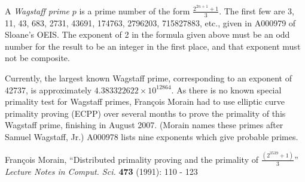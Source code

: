 \documentclass[12pt]{article}
\begin{document}
A {\em Wagstaff prime} $p$ is a prime number of the form $\displaystyle \frac{2^{2n + 1} + 1}{3}$. The first few are 3, 11, 43, 683, 2731, 43691, 174763, 2796203, 715827883, etc., given in A000979 of Sloane's OEIS. The exponent of 2 in the formula given above must be an odd number for the result to be an integer in the first place, and that exponent must not be composite.

Currently, the largest known Wagstaff prime, corresponding to an exponent of 42737, is approximately $4.383322622 \times 10^{12864}$. As there is no known special primality test for Wagstaff primes, Fran\c{c}ois Morain had to use elliptic curve primality proving (ECPP) over several months to prove the primality of this Wagstaff prime, finishing in August 2007.  (Morain names these primes after Samuel Wagstaff, Jr.) A000978 lists nine exponents which give probable primes.

\begin{thebibliography}{1}
 Fran\c{c}ois Morain, ``Distributed primality proving and the primality of $\frac{(2^{3539} + 1)}{3}$'' {\it Lecture Notes in Comput. Sci.} {\bf 473} (1991): 110 - 123
\end{thebibliography}
\end{document}
